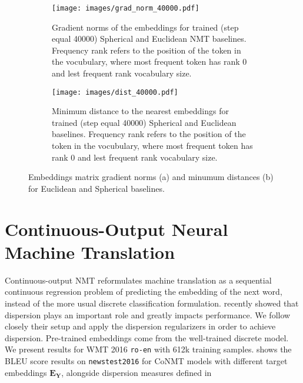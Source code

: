 \documentclass[10pt]{article} %
\newcommand{\langpair}[2]{\texttt{#1-#2}}
\begin{document}
\begin{figure}
    \centering
    \begin{subfigure}[]{0.49\textwidth}
        \texttt{[image: images/grad\_norm\_40000.pdf]}
        \caption{Gradient norms of the embeddings for trained (step equal 40000) Spherical and Euclidean NMT baselines. Frequency rank refers to the position of the token in the vocubulary, where most frequent token has rank 0 and lest frequent rank vocabulary size.} 
        \label{fig:gradient-norm-roen}
    \end{subfigure}\hfill
    \begin{subfigure}[]{0.49\textwidth}
        \texttt{[image: images/dist\_40000.pdf]}
        \caption{Minimum distance to the nearest embeddings for trained (step equal 40000) Spherical and Euclidean baselines. Frequency rank refers to the position of the token in the vocubulary, where most frequent token has rank 0 and lest frequent rank vocabulary size.} 
        \label{fig:min-dist-roen}
    \end{subfigure}
    \caption{Embeddings matrix gradient norms (a) and minumum distances (b) for Euclidean and Spherical baselines.}
\end{figure}

\section{Continuous-Output Neural Machine Translation}
Continuous-output NMT \citep[CoNMT,][]{kumar2018von}
reformulates machine translation as
a sequential continuous regression problem of predicting the embedding of the next word, instead of the more usual discrete classification formulation.
\citet{tokarchuk-niculae-2024-unreasonable} recently showed that dispersion plays an important role and greatly impacts performance.
We follow closely their setup and apply the dispersion regularizers in order to achieve dispersion. Pre-trained embeddings come from the well-trained discrete model. We present results for WMT 2016 \langpair{ro}{en} with 612k training samples.  shows the BLEU score results on \texttt{newstest2016} for CoNMT models with different target embeddings $\mathbf{E_Y}$, alongside dispersion measures defined in~
\end{document}
